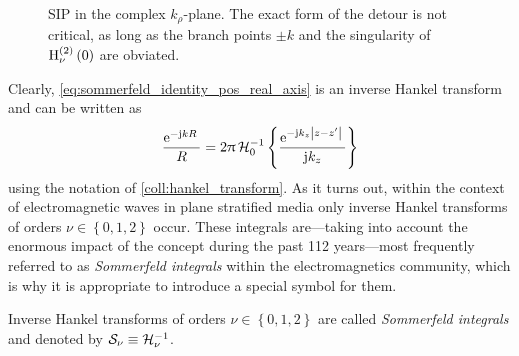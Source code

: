 \begin{figure}
	\centering
	\caption[\acl{SIP} in the complex $k_\rho$-plane]
	{\acf{SIP} in the complex $k_\rho$-plane. The exact form of the detour
	is not critical, as long as the branch points $\pm k$ and the singularity
	of $\operatorname{H}_{\nu}^{\left( 2 \right)} \left(0\right)$ are obviated.}
	\label{fig:si_paths}
\end{figure}

Clearly, \eqref{eq:sommerfeld_identity_pos_real_axis} is an inverse Hankel
transform and can be written as
\begin{equation}
		\frac{\mathrm{e}^{-\mathrm{j} k R}\,}{R} = 
		2\uppi \,
		\mathcal{H}^{-1}_{0}
		\left\{ \frac{\mathrm{e}^{-\mathrm{j} k_z \left\vert z - z^\prime\right\vert}\,}{\mathrm{j} k_z} \right\} 
\end{equation}
using the notation of \cref{coll:hankel_transform}.
As it turns out, within the context of electromagnetic waves in plane stratified
media only inverse Hankel transforms of orders $\nu \in \left\{0, 1, 2\right\}$
occur.
These integrals are---taking into account the enormous impact of the
concept during the past 112 years---most frequently referred to as
\emph{Sommerfeld integrals} within the electromagnetics community, which is why
it is appropriate to introduce a special symbol for them.
\begin{definition}	
	Inverse Hankel transforms of orders $\nu \in \left\{0, 1, 2\right\}$
	are called \emph{Sommerfeld integrals} and denoted by
	$\mathcal{S}_{\nu} \equiv \mathcal{H}^{-1}_{\nu}$.
\end{definition}











